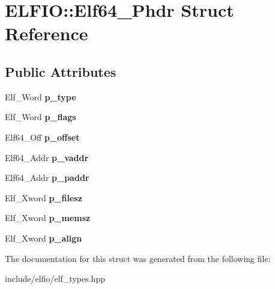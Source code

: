 \hypertarget{struct_e_l_f_i_o_1_1_elf64___phdr}{}\section{E\+L\+F\+IO\+:\+:Elf64\+\_\+\+Phdr Struct Reference}
\label{struct_e_l_f_i_o_1_1_elf64___phdr}
\subsection*{Public Attributes}
\begin{DoxyCompactItemize}
\item 
Elf\+\_\+\+Word {\bfseries p\+\_\+type}\hypertarget{struct_e_l_f_i_o_1_1_elf64___phdr_ae1834161a24089ad1e64ddbb802452b2}{}\label{struct_e_l_f_i_o_1_1_elf64___phdr_ae1834161a24089ad1e64ddbb802452b2}

\item 
Elf\+\_\+\+Word {\bfseries p\+\_\+flags}\hypertarget{struct_e_l_f_i_o_1_1_elf64___phdr_a44bd5784f97fa078adf25a8259331ed6}{}\label{struct_e_l_f_i_o_1_1_elf64___phdr_a44bd5784f97fa078adf25a8259331ed6}

\item 
Elf64\+\_\+\+Off {\bfseries p\+\_\+offset}\hypertarget{struct_e_l_f_i_o_1_1_elf64___phdr_ae776efcd77c125d3f99627bfc88e56cf}{}\label{struct_e_l_f_i_o_1_1_elf64___phdr_ae776efcd77c125d3f99627bfc88e56cf}

\item 
Elf64\+\_\+\+Addr {\bfseries p\+\_\+vaddr}\hypertarget{struct_e_l_f_i_o_1_1_elf64___phdr_a424c9cff8f46555b3aea049d2294a613}{}\label{struct_e_l_f_i_o_1_1_elf64___phdr_a424c9cff8f46555b3aea049d2294a613}

\item 
Elf64\+\_\+\+Addr {\bfseries p\+\_\+paddr}\hypertarget{struct_e_l_f_i_o_1_1_elf64___phdr_abc3fe06acfe322789c7119a72ac9bdc6}{}\label{struct_e_l_f_i_o_1_1_elf64___phdr_abc3fe06acfe322789c7119a72ac9bdc6}

\item 
Elf\+\_\+\+Xword {\bfseries p\+\_\+filesz}\hypertarget{struct_e_l_f_i_o_1_1_elf64___phdr_aa99f70376523cd2d6ed254b3cdeb510b}{}\label{struct_e_l_f_i_o_1_1_elf64___phdr_aa99f70376523cd2d6ed254b3cdeb510b}

\item 
Elf\+\_\+\+Xword {\bfseries p\+\_\+memsz}\hypertarget{struct_e_l_f_i_o_1_1_elf64___phdr_a8bb98afcdbcdcbecd5a9aef35c5c1764}{}\label{struct_e_l_f_i_o_1_1_elf64___phdr_a8bb98afcdbcdcbecd5a9aef35c5c1764}

\item 
Elf\+\_\+\+Xword {\bfseries p\+\_\+align}\hypertarget{struct_e_l_f_i_o_1_1_elf64___phdr_af5af6168cedd90ad440212b2289f5c19}{}\label{struct_e_l_f_i_o_1_1_elf64___phdr_af5af6168cedd90ad440212b2289f5c19}

\end{DoxyCompactItemize}


The documentation for this struct was generated from the following file\+:\begin{DoxyCompactItemize}
\item 
include/elfio/elf\+\_\+types.\+hpp\end{DoxyCompactItemize}
